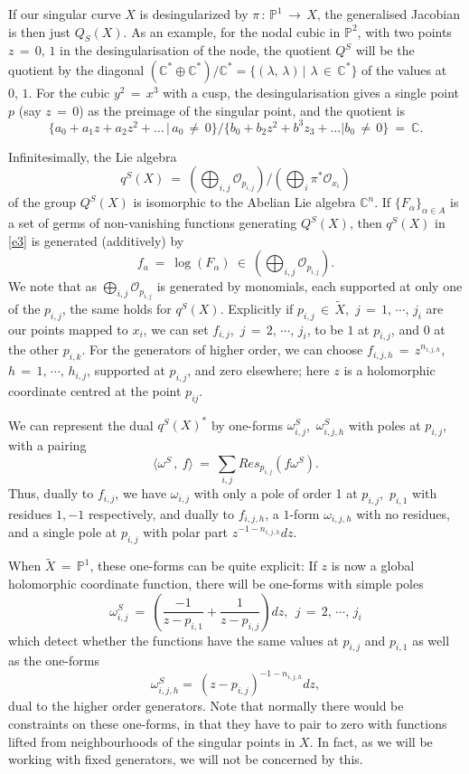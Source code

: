\documentclass[12pt,reqno]{amsart}
\numberwithin{equation}{section}
\theoremstyle{definition}
\theoremstyle{remark}
\def\bC{{\mathbb {C}}}
\def\bP{{\mathbb {P}}}
\def\pO{{\mathcal O}}
\begin{document}
If our singular curve $X$ is desingularized by $\pi\,:\, \bP^1\,\longrightarrow\, X$, the
generalised Jacobian is then just $Q_S(X)$. As an example, for the nodal cubic in $\bP^2$, with two points
$z\,=\,0,\,1$ in the desingularisation of the node, the quotient $Q^S$ will be the quotient by the
diagonal $(\bC^*\oplus \bC^*)/ \bC^*= \{(\lambda,\, \lambda)\, \big\vert\,\, \lambda\, \in\,\bC^*\}$
of the values at $0,\,1$. For the cubic $y^2 \,=\, x^3$ with a cusp, the desingularisation gives a single
point $p$ (say $z\,=\,0$) as the preimage of the singular point, and the quotient is
$$\{a_0 + a_1z +a_2z^2+\ldots\, \big\vert\, a_0\,\neq\, 0\}/\{b_0 + b_2z^2+b^3z_3+\ldots |b_0\,\neq
\, 0\}\ =\ \bC .$$
 
Infinitesimally, the Lie algebra 
 \begin{equation}\label{e3}
q^S(X)\ =\ \left(\bigoplus_{i,j} \pO_{p_{i,j}}\right){\Big/}\left(\bigoplus_i \pi^*\pO_{x_i}\right)
\end{equation}
of the group $Q^S(X)$ is isomorphic to the Abelian Lie algebra $\bC^n$. If $\{F_\alpha\}_{\alpha\in A}$
is a set of germs of non-vanishing functions generating $Q^S(X)$, then $q^S(X) $ in \eqref{e3}
is generated (additively) by
$$f_a \ =\ \log(F_\alpha)\ \in\ \left(\bigoplus_{i,j}\pO_{p_{i,j}}\right).$$
We note that as $\bigoplus_{i,j} \pO_{p_{i,j}}$ is generated by monomials, each
supported at only one of the $p_{i,j}$, the same holds for $q^S(X)$. Explicitly if $p_{i,j}\,\in\,
\widetilde X$,\,   $j \,=\, 1,\,\cdots ,\,j_i$ are our points mapped to $x_i$, we can set $f_{i,j}$,\,
$j\,=\, 2,\,\cdots ,\,j_i$, to be $1$ at $p_{i,j}$, and $0$ at the other $p_{i,k}$. For the generators
of higher order, we can choose $f_{i,j,h} \,=\, z^{n_{i,j, h}}$,\, $h\,=\, 1,\,\cdots,\, h_{i,j}$, supported
at $p_{i,j}$, and zero elsewhere; here $z$ is a holomorphic coordinate centred at the point $p_{ij}$.

We can represent  the  dual $q^S(X)^*$  by one-forms $\omega^S_{i,j}$,\, $\omega^S_{i,j,h}$ with poles at
$p_{i,j}$, with a pairing
$$\langle \omega^S \, ,\ f\rangle\ =\ \sum_{i,j} Res_{p_{i,j}}(f\omega^S).$$
Thus, dually to $f_{i,j}$, we have $\omega_{i,j} $ with only  a pole of order 1 at $p_{i,j}$,\, $p_{i,1}$ with residues $1, -1$ respectively, and  dually to $f_{i,j,h}$, a $1$-form $\omega_{i,j, h} $ with no residues, and a single pole at $p_{i,j} $ with polar part $z^{-1-n_{i,j, h} }dz$.
 
When  $\widetilde X \,=\, \bP^1$, these one-forms can be quite explicit: If $z$ is now a global holomorphic
coordinate function, there will be one-forms with simple poles 
$$\omega^S_{i, j}\ =\ \left(\frac{-1}{z-p_{i, 1}}+ \frac{1}{z-p_{i, j}}\right)dz ,\ \ j\,=\, 2,\,\cdots ,\, j_i$$
which detect whether the functions have the same values at $p_{i,j}$ and $p_{i,1}$ as well as the one-forms
$$\omega^{S}_{i,j,h} =\   (z-p_{i,j})^{-1-n_{i,j,h}}dz,$$
dual to the higher order generators. Note that normally there would be constraints on these one-forms, in that they have to pair to zero 
with functions lifted from neighbourhoods of the singular points in $X$. In fact, as we will be
working with fixed generators, we will not be concerned by this.
\end{document}
